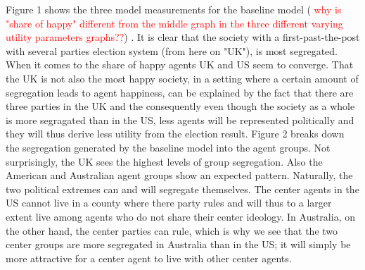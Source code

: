 \documentclass[12pt, a4paper]{article}
\begin{document}
Figure 1 shows the three model measurements for the baseline model ( \textcolor{red}{why is "share of happy" different from the middle graph in the three different varying utility parameters graphs??}) %
. It is clear that the society with a first-past-the-post with several parties election system (from here on "UK"), is most segregated. When it comes to the share of happy agents UK and US seem to converge. That the UK is not also the most happy society, in a setting where a certain amount of segregation leads to agent happiness, can be explained by the fact that there are three parties in the UK and the consequently even though the society as a whole is more segragated than in the US, less agents will be represented politically and they will thus derive less utility from the election result. Figure 2 breaks down the segregation generated by the baseline model into the agent groups. Not surprisingly, the UK sees the highest levels of group segregation. Also the American and Australian agent groups show an expected pattern. Naturally, the two political extremes can and will segregate themselves. The center agents in the US cannot live in a county where there party rules and will thus to a larger extent live among agents who do not share their center ideology. In Australia, on the other hand, the center parties can rule, which is why we see that the two center groups are more segregated in Australia than in the US; it will simply be more attractive for a center agent to live with other center agents. \newline \newline
\end{document}
